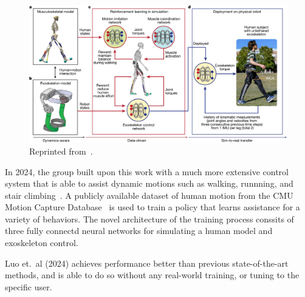 \documentclass[12pt]{report}
\theoremstyle{definition}
\theoremstyle{remark}
\begin{document}
\begin{figure}[H]
    \centering
    \includegraphics[width=\linewidth]{figs/exoskeleton.png}
    \caption{Reprinted from~\cite{luo_experiment-free_2024}.}
    \label{fig:luo2021}
\end{figure}

In 2024, the group built upon this work with a much more extensive control system that is able to assist dynamic motions such as walking, runnning, and stair climbing~\cite{luo_experiment-free_2024}. A publicly available dataset of human motion from the CMU Motion Capture Database~\cite{noauthor_cmu_nodate} is used to train a policy that learns assistance for a variety of behaviors. The novel architecture of the training process conssits of three fully connectd neural networks for simulating a human model and exoskeleton control.

Luo et.\ al (2024) achieves performance better than previous state-of-the-art methods, and is able to do so without any real-world training, or tuning to the specific user.
\end{document}
